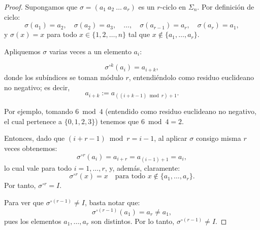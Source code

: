 \begin{proposicion}\label{proppaosjha}
\end{proposicion}


\begin{proof}
	Supongamos que \(\sigma = (a_1\ a_2\ \dots\ a_r)\) es un \(r\)-ciclo en \(\Sigma_n\). Por definición de ciclo:
	\[
	\sigma(a_1) = a_2,\quad \sigma(a_2) = a_3,\quad \dots,\quad \sigma(a_{r-1}) = a_r,\quad \sigma(a_r) = a_1,
	\]y \(\sigma(x) = x\) para todo \(x \in \{1, 2, \dots, n\}\) tal que \(x \notin \{a_1, \dots, a_r\}\).
	
	\medskip
	\noindent
	Apliquemos \(\sigma\) varias veces a un elemento \(a_i\):
	
	
	\[
	\sigma^{\circ k}(a_i) = a_{i+k},
	\] donde los subíndices se toman módulo \(r\), entendiéndolo como residuo euclideano no negativo; es decir,
	\[
	a_{i+k} := a_{((i+k-1) \bmod r) + 1}.
	\]
	
	\medskip\noindent
	Por ejemplo, tomando \(6 \bmod 4\) (entendido como residuo euclideano no negativo, el cual pertenece a \(\{0,1,2,3\}\)) tenemos que \(6 \bmod 4 = 2\).
	
	\medskip
	\noindent
	Entonces, dado que \((i+r-1) \bmod r = i-1\), al aplicar \(\sigma\) consigo misma \(r\) veces obtenemos:
	\[
	\sigma^{\circ r}(a_i) = a_{i+r} = a_{(i-1)+1}=a_i,
	\]
	lo cual vale para todo \(i = 1, \dots, r\), y, además, claramente:
	\[
	\sigma^{\circ r}(x) = x \quad \text{para todo } x \notin \{a_1, \dots, a_r\}.
	\]
	Por tanto, \(\sigma^{\circ r} = I\).
	
	\medskip
	\noindent
	Para ver que \(\sigma^{\circ (r-1)} \ne I\), basta notar que:
	\[
	\sigma^{\circ (r-1)}(a_1) = a_r \ne a_1,
	\]	pues los elementos \(a_1, \dots, a_r\) son distintos. Por lo tanto, \(\sigma^{\circ (r-1)} \ne I\).
\end{proof}


\begin{definicion}\label{jhgsd}
\end{definicion}

\begin{observacion}
\end{observacion}
\begin{observacion}\label{hghssd}
\end{observacion}


